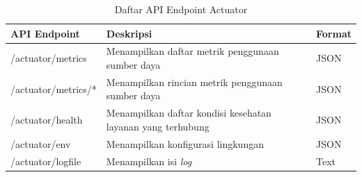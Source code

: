 \begin{longtable}{|p{3cm}|p{4.5cm}|p{1.5cm}|}
	\caption{Daftar API Endpoint Actuator} \label{t:api_actuator} \\ \hline
	\rowcolor{lightgray} API Endpoint & Deskripsi & Format \\ \hline
	/actuator/metrics & Menampilkan daftar metrik penggunaan sumber daya & JSON \\ \hline
	/actuator/metrics/* & Menampilkan rincian metrik penggunaan sumber daya & JSON \\ \hline
	/actuator/health & Menampilkan daftar kondisi kesehatan layanan yang terhubung & JSON \\ \hline
	/actuator/env & Menampilkan konfigurasi lingkungan & JSON \\ \hline
	/actuator/logfile & Menampilkan isi \textit{log} & Text \\ \hline
\end{longtable}
